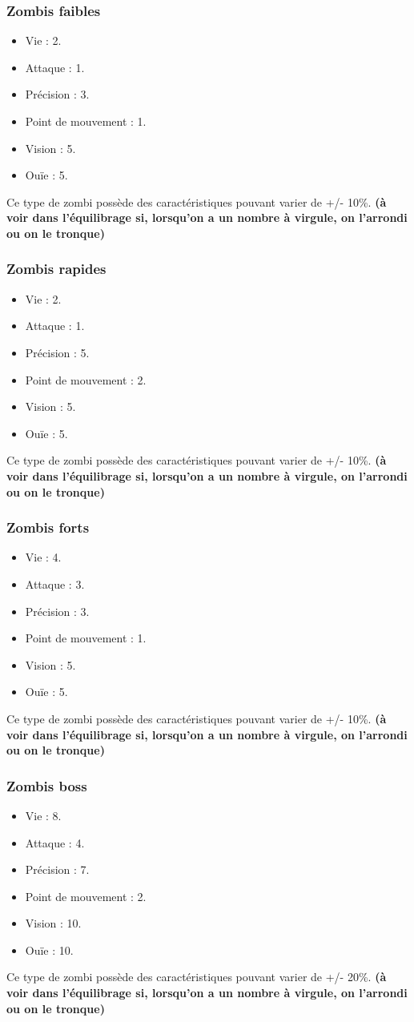 \subsubsection{Zombis faibles}
\begin{itemize}
  \item Vie : 2.
  \item Attaque : 1.
  \item Précision : 3.
  \item Point de mouvement : 1.
  \item Vision : 5.
  \item Ouïe : 5.
\end{itemize}
Ce type de zombi possède des caractéristiques pouvant varier de +/- 10\%. \textbf{(à voir dans l'équilibrage si, lorsqu'on a un nombre à virgule, on l'arrondi ou on le tronque)}
\subsubsection{Zombis rapides}
\begin{itemize}
  \item Vie : 2.
  \item Attaque : 1.
  \item Précision : 5.
  \item Point de mouvement : 2.
  \item Vision : 5.
  \item Ouïe : 5.
\end{itemize}
Ce type de zombi possède des caractéristiques pouvant varier de +/- 10\%. \textbf{(à voir dans l'équilibrage si, lorsqu'on a un nombre à virgule, on l'arrondi ou on le tronque)}
\subsubsection{Zombis forts}
\begin{itemize}
  \item Vie : 4.
  \item Attaque : 3.
  \item Précision : 3.
  \item Point de mouvement : 1.
  \item Vision : 5.
  \item Ouïe : 5.
\end{itemize}
Ce type de zombi possède des caractéristiques pouvant varier de +/- 10\%. \textbf{(à voir dans l'équilibrage si, lorsqu'on a un nombre à virgule, on l'arrondi ou on le tronque)}
\subsubsection{Zombis boss}
\begin{itemize}
  \item Vie : 8.
  \item Attaque : 4.
  \item Précision : 7.
  \item Point de mouvement : 2.
  \item Vision : 10.
  \item Ouïe : 10.
\end{itemize}
Ce type de zombi possède des caractéristiques pouvant varier de +/- 20\%. \textbf{(à voir dans l'équilibrage si, lorsqu'on a un nombre à virgule, on l'arrondi ou on le tronque)}
